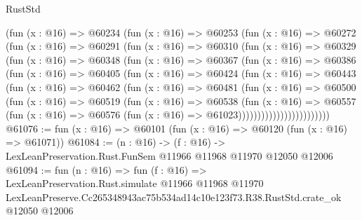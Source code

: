 \begin{lexlean}{RustStd}
\begin{coremodule}
            (fun (x : @16) =>
            @60234
              (fun (x : @16) =>
              @60253
                (fun (x : @16) =>
                @60272
                  (fun (x : @16) =>
                  @60291
                    (fun (x : @16) =>
                    @60310
                      (fun (x : @16) =>
                      @60329
                        (fun (x : @16) =>
                        @60348
                          (fun (x : @16) =>
                          @60367
                            (fun (x : @16) =>
                            @60386
                              (fun (x : @16) =>
                              @60405
                                (fun (x : @16) =>
                                @60424
                                  (fun (x : @16) =>
                                  @60443
                                    (fun (x : @16) =>
                                    @60462
                                      (fun (x : @16) =>
                                      @60481
                                        (fun (x : @16) =>
                                        @60500
                                          (fun (x : @16) =>
                                          @60519
                                            (fun (x : @16) =>
                                            @60538
                                              (fun (x : @16) =>
                                              @60557
                                                (fun (x : @16) =>
                                                @60576
                                                  (fun (x : @16) => @61023))))))))))))))))))))))))
@61076 := fun (x : @16) => @60101 (fun (x : @16) => @60120 (fun (x : @16) => @61071))
@61084 := (n : @16) ->
  (f : @16) -> LexLeanPreservation.Rust.FunSem @11966 @11968 @11970 @12050 @12006
@61094 := fun (n : @16) =>
  fun (f : @16) =>
  LexLeanPreservation.Rust.simulate
    @11966
    @11968
    @11970
    LexLeanPreserve.Cc265348943ac75b534ad14c10e123f73.R38.RustStd.crate_ok
    @12050
    @12006
\end{coremodule}
\end{lexlean}
